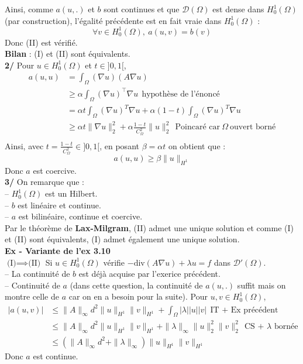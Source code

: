 \documentclass[a4paper,12pt]{article}
\newcommand{\Ho}{H^1_0(\Omega)}
\begin{document}
Ainsi, comme $a(u,.)$ et $b$ sont continues et que $\mathcal{D}(\Omega)$ est dense dans $\Ho$ (par construction), l'égalité précédente est en fait vraie dans $\Ho$ :
$$\boxed{\forall v \in \Ho, \ a(u,v)=b(v)}$$
Donc (II) est vérifié. \\

\textbf{Bilan} : (I) et (II) sont équivalents. \\

\textbf{2/} Pour $u \in \Ho$ et $t \in ]0,1[$, 
\begin{align*}
a(u,u) & = \int_{\Omega} (\nabla u)(A \nabla u) \\
& \geq \alpha \int_{\Omega} (\nabla u)^{\top} \nabla u \ \ \text{hypothèse de l'énoncé} \\
& = \alpha t  \int_{\Omega} (\nabla u)^{T} \nabla u + \alpha (1-t)  \int_{\Omega} (\nabla u)^{T} \nabla u \\
& \boxed{\geq \alpha t \| \nabla u \|_2^2 + \alpha \frac{1-t}{C_{\Omega}^2} \|u\|_2^2} \ \ \text{Poincaré car} \ \Omega \ \text{ouvert borné} \\
\end{align*}
Ainsi, avec $t=\frac{1-t}{C_{\Omega}^2} \in ]0,1[$, en posant $\beta = \alpha t$ on obtient que :
$$\boxed{a(u,u) \geq \beta \|u\|_{H^1}}$$
Donc $a$ est coercive. \\

\textbf{3/} On remarque que : \\
-- $\Ho$ est un Hilbert. \\
-- $b$ est linéaire et continue. \\
-- $a$ est bilinéaire, continue et coercive. \\

Par le théorème de \textbf{Lax-Milgram}, (II) admet une unique solution et comme (I) et (II) sont équivalents, (I) admet également une unique solution. \\

\textbf{Ex - Variante de l'ex 3.10} \\

$\boxed{\text{(I)} \implies \text{(II)}}$ Si $u \in \Ho$ vérifie $-\text{div}(A \nabla u) + \lambda u = f$ dans $\mathcal{D}'(\Omega)$. \\
-- La continuité de $b$ est déjà acquise par l'exerice précédent. \\
-- Continuité de $a$ (dans cette question, la continuité de $a(u,.)$ suffit mais on montre celle de $a$ car on en a besoin pour la suite). Pour $u,v \in \Ho$, 
\begin{align*}
|a(u,v)| & \leq \|A\|_{\infty} d^2 \|u\|_{H^1} \|v\|_{H^1} + \int_{\Omega} |\lambda| |u||v| \ \  \text{IT + Ex précédent} \\
& \leq \|A\|_{\infty} d^2 \|u\|_{H^1} \|v\|_{H^1} + \|\lambda \|_{\infty} \|u\|_2^2 \|v\|_2^2  \ \ \text{CS + } \lambda \text{ bornée} \\
& \boxed{\leq (\|A\|_{\infty} d^2 + \|\lambda\|_{\infty}) \|u\|_{H^1} \|v\|_{H^1}}
\end{align*}
Donc $a$ est continue. \\
\end{document}
